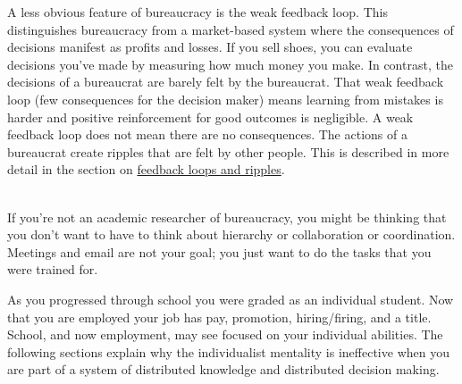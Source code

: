 A less obvious feature of bureaucracy is the weak \gls{feedback loop}. This distinguishes bureaucracy from a market-based system where the consequences of decisions manifest as profits and losses. If you sell shoes, you can evaluate decisions you've made by measuring how much money you make. In contrast, the decisions of a bureaucrat are barely felt by the bureaucrat. That weak feedback loop (few consequences for the decision maker) means learning from mistakes is harder and positive reinforcement for good outcomes is negligible. A weak feedback loop does not mean there are no consequences. The actions of a bureaucrat create ripples that are felt by other people. This is described in more detail in the section on \hyperref[sec:feedback-loop-and-ripples]{feedback loops and ripples}.

\ \\

If you're not an academic researcher of bureaucracy, you might be thinking that you don't want to have to think about hierarchy or collaboration or coordination. Meetings and email are not your goal; you just want to do the tasks that you were trained for. 

As you progressed through school you were graded as an individual student. Now that you are employed your job has pay, promotion, hiring/firing, and a title. School, and now employment, may see focused on your individual abilities. The following sections explain why the individualist mentality is ineffective when you are part of a system of distributed knowledge and distributed decision making. 


